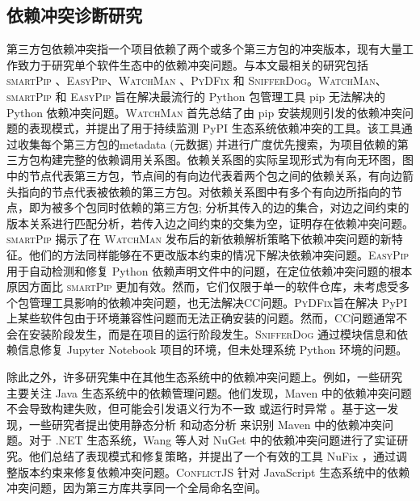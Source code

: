 \subsection{依赖冲突诊断研究}
第三方包依赖冲突指一个项目依赖了两个或多个第三方包的冲突版本，现有大量工作致力于研究单个软件生态中的依赖冲突问题。与本文最相关的研究包括 \textsc{smartPip} 、\textsc{EasyPip}、\textsc{WatchMan} 、\textsc{PyDFix} 和 \textsc{SnifferDog}。\textsc{WatchMan}、\textsc{smartPip} 和 \textsc{EasyPip} 旨在解决最流行的 Python 包管理工具 pip 无法解决的 Python 依赖冲突问题。\textsc{WatchMan} 首先总结了由 pip 安装规则引发的依赖冲突问题的表现模式，并提出了用于持续监测 PyPI 生态系统依赖冲突的工具。该工具通过收集每个第三方包的metadata (元数据) 并进行广度优先搜索，为项目依赖的第三方包构建完整的依赖调用关系图。依赖关系图的实际呈现形式为有向无环图，图中的节点代表第三方包，节点间的有向边代表着两个包之间的依赖关系，有向边箭头指向的节点代表被依赖的第三方包。对依赖关系图中有多个有向边所指向的节点，即为被多个包同时依赖的第三方包; 分析其传入的边的集合，对边之间约束的版本关系进行匹配分析，若传入边之间约束的交集为空，证明存在依赖冲突问题。\textsc{smartPip} 揭示了在 \textsc{WatchMan} 发布后的新依赖解析策略下依赖冲突问题的新特征。他们的方法同样能够在不更改版本约束的情况下解决依赖冲突问题。\textsc{EasyPip} 用于自动检测和修复 Python 依赖声明文件中的问题，在定位依赖冲突问题的根本原因方面比 \textsc{smartPip} 更加有效。然而，它们仅限于单一的软件仓库，未考虑受多个包管理工具影响的依赖冲突问题，也无法解决CC问题。\textsc{PyDFix}旨在解决 PyPI 上某些软件包由于环境兼容性问题而无法正确安装的问题。然而，CC问题通常不会在安装阶段发生，而是在项目的运行阶段发生。\textsc{SnifferDog} 通过模块信息和依赖信息修复 Jupyter Notebook 项目的环境，但未处理系统 Python 环境的问题。

除此之外，许多研究集中在其他生态系统中的依赖冲突问题上。例如，一些研究  主要关注 Java 生态系统中的依赖管理问题。他们发现，Maven 中的依赖冲突问题不会导致构建失败，但可能会引发语义行为不一致  或运行时异常 。基于这一发现，一些研究者提出使用静态分析 和动态分析  来识别 Maven 中的依赖冲突问题。对于 .NET 生态系统，Wang 等人对 NuGet 中的依赖冲突问题进行了实证研究。他们总结了表现模式和修复策略，并提出了一个有效的工具 NuFix ，通过调整版本约束来修复依赖冲突问题。\textsc{ConflictJS} 针对 JavaScript 生态系统中的依赖冲突问题，因为第三方库共享同一个全局命名空间。

